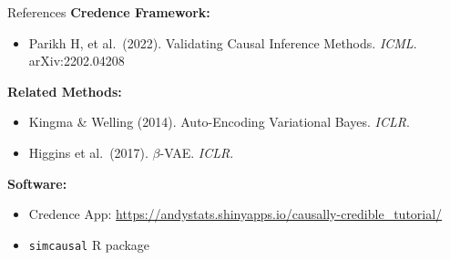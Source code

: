 \documentclass[aspectratio=169]{beamer}
\begin{document}
\begin{frame}{References}
  \footnotesize
  \textbf{Credence Framework:}
  \begin{itemize}
    \item Parikh H, et al.\ (2022). Validating Causal Inference Methods. \textit{ICML}. arXiv:2202.04208
  \end{itemize}

  \textbf{Related Methods:}
  \begin{itemize}
    \item Kingma \& Welling (2014). Auto-Encoding Variational Bayes. \textit{ICLR}.
    \item Higgins et al.\ (2017). $\beta$-VAE. \textit{ICLR}.
  \end{itemize}

  \textbf{Software:}
  \begin{itemize}
    \item Credence App: \url{https://andystats.shinyapps.io/causally-credible_tutorial/}
    \item \texttt{simcausal} R package
  \end{itemize}
\end{frame}
\end{document}
